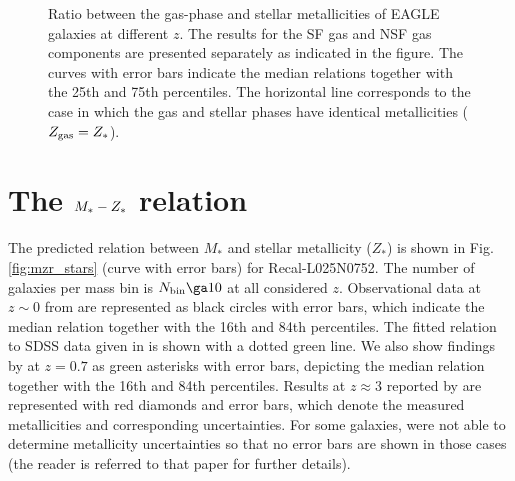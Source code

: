 \documentclass[useAMS,usenatbib]{mn2e}
\begin{document}
\begin{figure}
\begin{center}
\end{center}
\caption[]
{
Ratio between the gas-phase and stellar metallicities of {\sc EAGLE} galaxies at
different $z$.  The results for the SF gas and NSF gas components are presented
separately as indicated in the figure. The curves with error bars indicate the median relations together
with the 25th and 75th percentiles. The horizontal line corresponds to the case in which the gas and stellar
phases have identical metallicities ($Z_{\rm gas} = Z_*$).
}
\label{fig:ZgZs_vs_M}
\end{figure}


\section{The $M_{*} - Z_{\rm *}$ relation}
\label{sec:mzr_stars}

The predicted relation between $M_*$ and stellar metallicity ($Z_*$) is shown 
in Fig. \ref{fig:mzr_stars} (curve with error bars) for Recal-L025N0752. 
The number of galaxies per mass bin is $N_{\rm bin} \ga 10$ at all considered $z$.
Observational data at $z\sim 0$ from \citet{gallazzi2005} are represented as
black circles with error bars, which indicate the median relation together with the 16th and 84th percentiles.
The fitted relation to SDSS data given in \citet{panter2008} is shown with a dotted green line.
We also show findings by \citet{gallazzi2014} at $z=0.7$ as green asterisks with error bars,
depicting the median relation together with the 16th and 84th percentiles.
Results at $z \approx 3$ reported by \citet{sommariva2011} are represented with 
red diamonds and error bars, which
denote the measured metallicities and corresponding uncertainties.
For some galaxies, \citet{sommariva2011} were not able to determine metallicity uncertainties so that
no error bars are shown in those cases (the reader is referred to that paper for further details).
\end{document}
